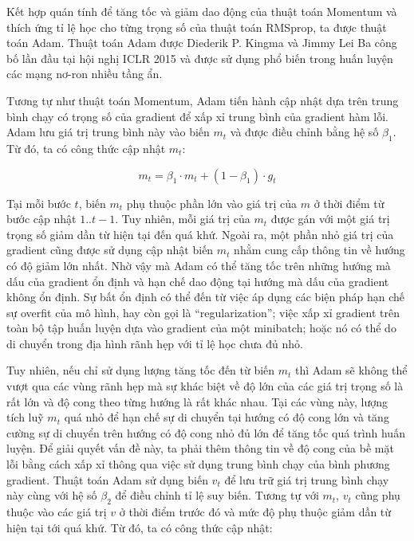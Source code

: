 Kết hợp quán tính để tăng tốc và giảm dao động của thuật toán Momentum và thích ứng tỉ lệ học cho từng trọng số của thuật toán RMSprop, ta được thuật toán Adam. Thuật toán Adam \cite{kingma2014adam} được Diederik P. Kingma và Jimmy Lei Ba công bố lần đầu tại hội nghị ICLR 2015 và được sử dụng phổ biến trong huấn luyện các mạng nơ-ron nhiều tầng ẩn.

Tương tự như thuật toán Momentum, Adam tiến hành cập nhật dựa trên trung bình chạy có trọng số của gradient để xấp xỉ trung bình của gradient hàm lỗi. Adam lưu giá trị trung bình này vào biến $m_t$ và được điều chỉnh bằng hệ số $\beta_1$. Từ đó, ta có công thức cập nhật $m_t$:

\begin{equation} \label{eqn:adam-m}
	m_t = \beta_1 \cdot m_t + (1 - \beta_1) \cdot g_t
\end{equation}

Tại mỗi bước $t$, biến $m_t$ phụ thuộc phần lớn vào giá trị của $m$ ở thời điểm từ bước cập nhật $1..t-1$. Tuy nhiên, mỗi giá trị của $m_t$ được gán với một giá trị trọng số giảm dần từ hiện tại đến quá khứ. Ngoài ra, một phần nhỏ giá trị của gradient cũng được sử dụng cập nhật biến $m_t$ nhằm cung cấp thông tin về hướng có độ giảm lớn nhất. Nhờ vậy mà Adam có thể tăng tốc trên những hướng mà dấu của gradient ổn định và hạn chế dao động tại hướng mà dấu của gradient không ổn định. Sự bất ổn định có thể đến từ việc áp dụng các biện pháp hạn chế sự overfit của mô hình, hay còn gọi là ``regularization''; việc xấp xỉ gradient trên toàn bộ tập huấn luyện dựa vào gradient của một minibatch; hoặc nó có thể do di chuyển trong địa hình rãnh hẹp với tỉ lệ học chưa đủ nhỏ.

Tuy nhiên, nếu chỉ sử dụng lượng tăng tốc đến từ biến $m_t$ thì Adam sẽ không thể vượt qua các vùng rãnh hẹp mà sự khác biệt về độ lớn của các giá trị trọng số là rất lớn và độ cong theo từng hướng là rất khác nhau. Tại các vùng này, lượng tích luỹ $m_t$ quá nhỏ để hạn chế sự di chuyển tại hướng có độ cong lớn và tăng cường sự di chuyển trên hướng có độ cong nhỏ đủ lớn để tăng tốc quá trình huấn luyện. Để giải quyết vấn đề này, ta phải thêm thông tin về độ cong của bề mặt lỗi bằng cách xấp xỉ thông qua việc sử dụng trung bình chạy của bình phương gradient. Thuật toán Adam sử dụng biến $v_t$ để lưu trữ giá trị trung bình chạy này cùng với hệ số $\beta_2$ để điều chỉnh tỉ lệ suy biến. Tương tự với $m_t$, $v_t$ cũng phụ thuộc vào các giá trị $v$ ở thời điểm trước đó và mức độ phụ thuộc giảm dần từ hiện tại tới quá khứ. Từ đó, ta có công thức cập nhật:

